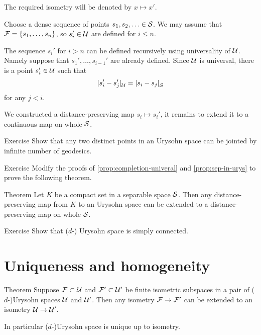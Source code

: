 The required isometry will be denoted by $x\mapsto x'$.

Choose a dense sequence of points $s_1,s_2,\dotsc\in\mathcal{S}$.
We may assume that $\mathcal{F}=\{s_1,\dots,s_n\}$, so $s_i'\in \mathcal{U}$ are defined for $i\le n$.

The sequence $s_i'$ for $i>n$ can be defined recursively using universality of $\mathcal{U}$.
Namely suppose that $s_1',\dots,s_{i-1}'$ are already defined.
Since $\mathcal{U}$ is universal, there is a point $s_i'\in \mathcal{U}$ such that
\[\dist{s_i'}{s_j'}{\spc{U}}=\dist{s_i}{s_j}{\spc{S}}\]
for any $j<i$.

We constructed a distance-preserving map $s_i\mapsto s_i'$, it remains to extend it to a continuous map on whole $\mathcal{S}$.
\qeds

\begin{thm}{Exercise}\label{ex:geodesics-urysohn}
Show that any two distinct points in an Urysohn space can be jointed by infinite number of geodesics.
\end{thm}

\begin{thm}{Exercise}\label{ex:compact-extension}
Modify the proofs of \ref{prop:completion-univeral} and \ref{prop:sep-in-urys} to prove the following theorem.
\end{thm}

\begin{thm}{Theorem}\label{thm:compact-extension}
Let $K$ be a compact set in a separable space $\mathcal{S}$.
Then any distance-preserving map from $K$ to an Urysohn space can be extended to 
a distance-preserving map on whole $\mathcal{S}$.
\end{thm}

\begin{thm}{Exercise}\label{ex:sc-urysohn}
Show that ($d$-) Urysohn space is simply connected.
\end{thm}

\section{Uniqueness and homogeneity}

\begin{thm}{Theorem}\label{thm:urysohn-unique}
Suppose $\mathcal{F}\subset \mathcal{U}$ and $\mathcal{F}'\subset \mathcal{U}'$ be finite isometric subspaces in a pair of ($d$-)Urysohn spaces $\mathcal{U}$ and $\mathcal{U}'$.
Then any isometry $\mathcal{F}\to \mathcal{F}'$ can be extended to an isometry $\mathcal{U}\to \mathcal{U}'$.

In particular ($d$-)Urysohn space is unique up to isometry.
\end{thm}

